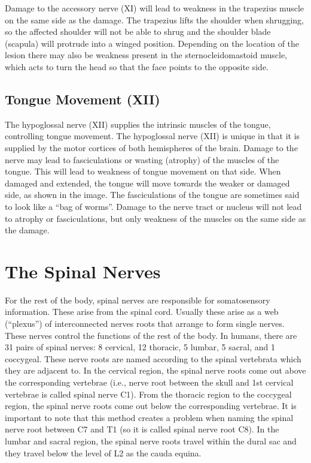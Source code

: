 Damage to the accessory nerve (XI) will lead to weakness in the trapezius muscle on the same side as the damage. The trapezius lifts the shoulder when shrugging, so the affected shoulder will not be able to shrug and the shoulder blade (scapula) will protrude into a winged position. Depending on the location of the lesion there may also be weakness present in the sternocleidomastoid muscle, which acts to turn the head so that the face points to the opposite side.

\hypertarget{tongue-movement-xii}{%
\subsection{Tongue Movement (XII)}\label{tongue-movement-xii}}

The hypoglossal nerve (XII) supplies the intrinsic muscles of the tongue, controlling tongue movement. The hypoglossal nerve (XII) is unique in that it is supplied by the motor cortices of both hemispheres of the brain. Damage to the nerve may lead to fasciculations or wasting (atrophy) of the muscles of the tongue. This will lead to weakness of tongue movement on that side. When damaged and extended, the tongue will move towards the weaker or damaged side, as shown in the image. The fasciculations of the tongue are sometimes said to look like a ``bag of worms''. Damage to the nerve tract or nucleus will not lead to atrophy or fasciculations, but only weakness of the muscles on the same side as the damage.

\hypertarget{the-spinal-nerves}{%
\section{The Spinal Nerves}\label{the-spinal-nerves}}

For the rest of the body, spinal nerves are responsible for somatosensory information. These arise from the spinal cord. Usually these arise as a web (``plexus'') of interconnected nerves roots that arrange to form single nerves. These nerves control the functions of the rest of the body. In humans, there are 31 pairs of spinal nerves: 8 cervical, 12 thoracic, 5 lumbar, 5 sacral, and 1 coccygeal. These nerve roots are named according to the spinal vertebrata which they are adjacent to. In the cervical region, the spinal nerve roots come out above the corresponding vertebrae (i.e., nerve root between the skull and 1st cervical vertebrae is called spinal nerve C1). From the thoracic region to the coccygeal region, the spinal nerve roots come out below the corresponding vertebrae. It is important to note that this method creates a problem when naming the spinal nerve root between C7 and T1 (so it is called spinal nerve root C8). In the lumbar and sacral region, the spinal nerve roots travel within the dural sac and they travel below the level of L2 as the cauda equina.

